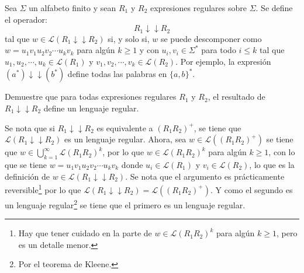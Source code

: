 \documentclass{homework}
\newcommand{\ddarrow}{\ensuremath{\downarrow\downarrow}}
\begin{document}
\begin{p2}
    \begin{prob}
        Sea \(\Sigma\) un alfabeto finito y sean \(R_1\) y \(R_2\) expresiones regulares sobre \(\Sigma\). Se define el operador:
        \begin{equation*}
            R_1\ddarrow R_2
        \end{equation*}
        tal que \(w\in\mathcal{L}(R_1\ddarrow R_2)\) si, y solo si, \(w\) se puede descomponer como \(w=u_1v_1u_2v_2\cdots u_kv_k\) para algún \(k\geq1\) y con \(u_i,v_i\in\Sigma^*\) para todo \(i\leq k\) tal que \(u_1,u_2,\cdots,u_k\in\mathcal{L}(R_1)\) y \(v_1,v_2,\cdots,v_k\in\mathcal{L}(R_2)\). Por ejemplo, la expresión \((a^*)\ddarrow(b^*)\) define todas las palabras en \(\{a,b\}^*\).

        Demuestre que para todas expresiones regulares \(R_1\) y \(R_2\), el resultado de \(R_1\ddarrow R_2\) define un lenguaje regular.
    \end{prob}

    \begin{sol}
        Se nota que si \(R_1\ddarrow R_2\) es equivalente a \((R_1R_2)^+\), se tiene que \(\mathcal{L}(R_1\ddarrow R_2)\) es un lenguaje regular. Ahora, sea \(w\in\mathcal{L}((R_1R_2)^+)\) se tiene que \(w\in\bigcup_{k=1}^\infty\mathcal{L}(R_1R_2)^k\), por lo que \(w\in\mathcal{L}(R_1R_2)^k\) para algún \(k\geq1\), con lo que se tiene \(w=u_1v_1u_2v_2\cdots u_kv_k\) donde \(u_i\in\mathcal{L}(R_1)\) y \(v_i\in\mathcal{L}(R_2)\), lo que es la definición de \(w\in\mathcal{L}(R_1\ddarrow R_2)\). Se nota que el argumento es prácticamente reversible\footnote{Hay que tener cuidado en la parte de \(w\in\mathcal{L}(R_1R_2)^k\) para algún \(k\geq1\), pero es un detalle menor.} por lo que \(\mathcal{L}(R_1\ddarrow R_2)=\mathcal{L}((R_1R_2)^+)\). Y como el segundo es un lenguaje regular\footnote{Por el teorema de Kleene.} se tiene que el primero es un lenguaje regular.
    \end{sol}
\end{p2}
\end{document}
